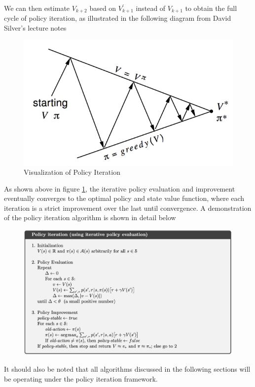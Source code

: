 \documentclass[12pt]{report}
\begin{document}
We can then estimate $V_{k+2}$ based on $V_{k+1}^\prime$ instead of $V_{k+1}$ to obtain the full cycle of policy iteration, as illustrated in the following diagram from David Silver's lecture notes \cite{silver2015}
\begin{figure}[H]
    \center
    \includegraphics[width=0.45\linewidth]{figs/policy-iter.png}
    \caption{Visualization of Policy Iteration}
    \label{fig:policy-iter}
\end{figure}
As shown above in figure \ref{fig:policy-iter}, the iterative policy evaluation and improvement eventually converges to the optimal policy and state value function, where each iteration is a strict improvement over the last until convergence. A demonstration \cite{sutton2018reinforcement} of the policy iteration algorithm is shown in detail below
\begin{figure}[H]
    \center
    \includegraphics[width=0.8\linewidth]{figs/policy-iter-code.png}
    \label{fig:policy-iter-code}
\end{figure}
It should also be noted that all algorithms discussed in the following sections will be operating under the policy iteration framework.
\end{document}
